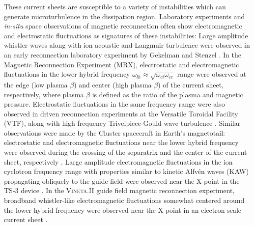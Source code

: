 \documentclass[aip,preprint]{revtex4-1}
\begin{document}
These current sheets are susceptible to a variety of instabilities which can generate microturbulence in the dissipation region. Laboratory experiments \cite{ji2004,fox2010,inomoto2013,dorfman2014,kuwahata2014,stechow2016} and {\it in-situ} space observations \cite{eastwood2009,zhou2009,retino2007} of magnetic reconnection often show electromagnetic and electrostatic fluctuations as signatures of these instabilities: Large amplitude whistler waves along with ion acoustic and Langmuir turbulence were observed in an early reconnection laboratory experiment by Gekelman and Stenzel \cite{gekelman1984}. In the Magnetic Reconnection Experiment (MRX), electrostatic \cite{carter2002} and electromagnetic \cite{ji2004} fluctuations in the lower hybrid frequency $\omega_{lh}\approx \sqrt{\omega_{ci}\omega_{ce}}$ range were observed at the edge (low plasma $\beta$) and center (high plasma $\beta$) of the current sheet, respectively, where 
plasma $\beta$ is defined as the ratio of the plasma and magnetic pressure. Electrostatic fluctuations in the same frequency range were also observed in driven reconnection experiments at the Versatile Toroidal Facility (VTF), along with high frequency Trivelpiece-Gould wave turbulence \cite{fox2010}. Similar observations were made by the Cluster spacecraft in Earth's magnetotail: electrostatic and electromagnetic fluctuations near the lower hybrid frequency were observed during the crossing of the separatrix and the center of the current sheet, respectively \cite{zhou2009}. Large amplitude electromagnetic fluctuations in the ion cyclotron frequency range with properties similar to kinetic Alfv\'en waves (KAW) propagating obliquely to the guide field  were observed near the X-point in the TS-3 device \cite{inomoto2013}. In the \textsc{Vineta}.II guide field magnetic reconnection experiment, broadband whistler-like electromagnetic fluctuations somewhat centered around the lower hybrid frequency were observed near the X-point  in an electron scale current sheet \cite{stechow2016}.  
\end{document}
